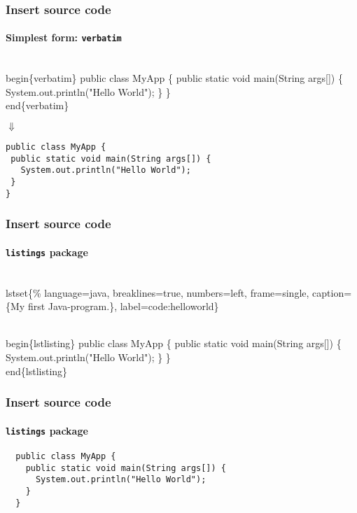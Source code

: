 \documentclass[aspectratio=169]{beamer}
\begin{document}
\begin{frame}[fragile]
 \frametitle{Insert source code}
 \framesubtitle{Simplest form: \texttt{verbatim}}

\begin{semiverbatim}
\alert{\\begin\{verbatim\}}
public class MyApp \{
 public static void main(String args[]) \{
   System.out.println("Hello World");
 \}
\}
\alert{\\end\{verbatim\}}
\end{semiverbatim}

  \centering
  $\Downarrow$

\begin{verbatim}
public class MyApp {
 public static void main(String args[]) {
   System.out.println("Hello World");
 }
}
\end{verbatim}

\end{frame}

\begin{frame}[fragile]
 \frametitle{Insert source code}
 \framesubtitle{\texttt{listings} package}

\begin{semiverbatim}
\\lstset\{\%
language=java,  breaklines=true,  numbers=left,
frame=single, caption=\{My first Java-program.\},
label=code:helloworld\}

\alert{\\begin\{lstlisting\}}
public class MyApp \{
 public static void main(String args[]) \{
   System.out.println("Hello World");
 \}
\}
\alert{\\end\{lstlisting\}}
\end{semiverbatim}

\end{frame}

\begin{frame}[fragile]
 \frametitle{Insert source code}
 \framesubtitle{\texttt{listings} package}


  \begin{lstlisting}
  public class MyApp {
    public static void main(String args[]) {
      System.out.println("Hello World");
    }
  }
  \end{lstlisting}

\end{frame}
\end{document}
